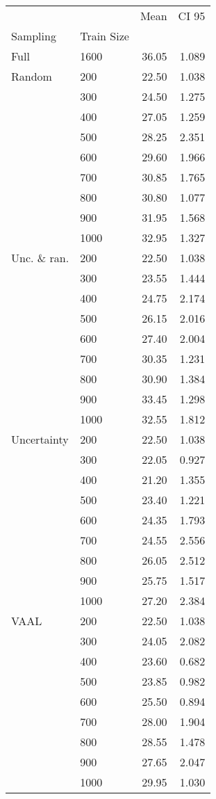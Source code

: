 \begin{tabular}{llrr}
\toprule
     &      &   Mean &  CI 95 \\
Sampling & Train Size &        &        \\
\midrule
Full & 1600 &  36.05 &  1.089 \\
Random & 200  &  22.50 &  1.038 \\
     & 300  &  24.50 &  1.275 \\
     & 400  &  27.05 &  1.259 \\
     & 500  &  28.25 &  2.351 \\
     & 600  &  29.60 &  1.966 \\
     & 700  &  30.85 &  1.765 \\
     & 800  &  30.80 &  1.077 \\
     & 900  &  31.95 &  1.568 \\
     & 1000 &  32.95 &  1.327 \\
Unc. \& ran. & 200  &  22.50 &  1.038 \\
     & 300  &  23.55 &  1.444 \\
     & 400  &  24.75 &  2.174 \\
     & 500  &  26.15 &  2.016 \\
     & 600  &  27.40 &  2.004 \\
     & 700  &  30.35 &  1.231 \\
     & 800  &  30.90 &  1.384 \\
     & 900  &  33.45 &  1.298 \\
     & 1000 &  32.55 &  1.812 \\
Uncertainty & 200  &  22.50 &  1.038 \\
     & 300  &  22.05 &  0.927 \\
     & 400  &  21.20 &  1.355 \\
     & 500  &  23.40 &  1.221 \\
     & 600  &  24.35 &  1.793 \\
     & 700  &  24.55 &  2.556 \\
     & 800  &  26.05 &  2.512 \\
     & 900  &  25.75 &  1.517 \\
     & 1000 &  27.20 &  2.384 \\
VAAL & 200  &  22.50 &  1.038 \\
     & 300  &  24.05 &  2.082 \\
     & 400  &  23.60 &  0.682 \\
     & 500  &  23.85 &  0.982 \\
     & 600  &  25.50 &  0.894 \\
     & 700  &  28.00 &  1.904 \\
     & 800  &  28.55 &  1.478 \\
     & 900  &  27.65 &  2.047 \\
     & 1000 &  29.95 &  1.030 \\
\bottomrule
\end{tabular}

